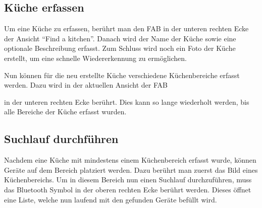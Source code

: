 \subsection{Küche erfassen}
Um eine Küche zu erfassen, berührt man den \acl{FAB} in der unteren rechten Ecke der Ansicht \enquote{Find a kitchen}. Danach wird der Name der Küche sowie eine optionale Beschreibung erfasst. Zum Schluss wird noch ein Foto der Küche erstellt, um eine schnelle Wiedererkennung zu ermöglichen.

Nun können für die neu erstellte Küche verschiedene Küchenbereiche erfasst werden. Dazu wird in der aktuellen Ansicht der \acl{FAB}

\WFclear
in der unteren rechten Ecke berührt. Dies kann so lange wiederholt werden, bis alle Bereiche der Küche erfasst wurden. 

\subsection{Suchlauf durchführen}

Nachdem eine Küche mit mindestens einem Küchenbereich erfasst wurde, können Geräte auf dem Bereich platziert werden. Dazu berührt man zuerst das Bild eines Küchenbereichs. Um in diesem Bereich nun einen Suchlauf durchzuführen, muss das Bluetooth Symbol in der oberen rechten Ecke berührt werden. Dieses öffnet eine Liste, welche nun laufend mit den gefunden Geräte befüllt wird. 

